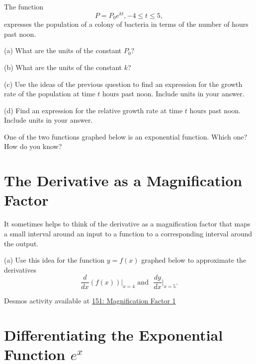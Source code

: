 \documentclass{ximera}
\begin{document}
\begin{question}  \label{Q:3dgtnzz}
The function 
\[
      P = P_0 e^{kt}, -4\leq t \leq 5 ,
\]
expresses the population of a colony of bacteria in terms of the number of hours past noon.


(a) What are the units of the constant $P_0$?

(b) What are the units of the constant $k$?

(c) Use the ideas of the previous question to find an expression for the growth rate of the population at time $t$ hours past noon. Include units in your answer.

(d) Find an expression for the relative growth rate at time $t$ hours past noon. Include units in your answer.

\end{question}



\begin{question} \label{Qdcvbrtt}
One of the two functions graphed below is an exponential function. Which one? How do you know?
\end{question}



\section*{The Derivative as a Magnification Factor}
\begin{exploration}   \label{Ex:325gyt}

It sometimes helps to think of the derivative as a magnification factor that maps a small interval around an input to a function to a corresponding interval around the output.

(a) Use this idea for the function $y=f(x)$ graphed below to approximate the derivatives 
\[
    \frac{d}{dx} (f(x))\Big|_{x=4} \text{  and  } \,\, \frac{dy}{dx}\Big|_{x=5} .
\]


\begin{onlineOnly}
    \begin{center}
\end{center}
\end{onlineOnly}


Desmos activity available at \href{https://www.desmos.com/calculator/la4f5ots3r}{151: Magnification Factor 1}

\end{exploration}


\section*{Differentiating the Exponential Function $e^x$}
\end{document}
